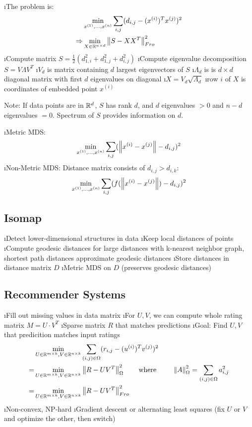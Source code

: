 \be
\i The problem is: \begin{align*}
&\min_{x^{(1)}, \ldots, x^{(n)}} \displaystyle\sum_{i,j} (d_{i,j} - (x^{(i)})^Tx^{(j)})^2 \\
\Rightarrow & \min_{X \in \mathbb{R}^{n \times d}} \left\lVert S-XX^T\right\rVert^2_{Fro} 
\end{align*}
\i Compute matrix $S = \frac{1}{2} (d^2_{1,i} + d^2_{1,j} + d^2_{i,j})$
\i Compute eigenvalue decomposition $S = V \Lambda V^T$
\i $V_d$ is matrix containing $d$ largest eigenvectors of $S$
\i $\Lambda_d$ is is $d \times d$ diagonal matrix with first $d$ eigenvalues on diagonal
\i $X = V_d \sqrt{\Lambda_d}$
\i row $i$ of $X$ is coordinates of embedded point $x^{(i)}$
\ee

Note: If data points are in $\mathbb{R}^d$, $S$ has rank $d$, and $d$ eigenvalues $>0$ and $n-d$ eigenvalues $=0$. Spectrum of $S$ provides information on $d$.


\bi
\i Metric MDS: \[\min_{x^{(1)}, \ldots, x^{(n)}} \displaystyle\sum_{i,j} ( \left\lVert x^{(i)} - x^{(j)}\right\rVert - d_{i,j})^2 \]
\i Non-Metric MDS: Distance matrix consists of $d_{i,j} > d_{i,k}$: \[\min_{x^{(1)}, \ldots, x^{(n)}} \displaystyle\sum_{i,j} ( f(\left\lVert x^{(i)} - x^{(j)}\right\rVert) - d_{i,j})^2\]
\ei

\subsection{Isomap}

\bi
\i Detect lower-dimensional structures in data
\i Keep local distances of points
\i Compute geodesic distances for large distances with k-nearest neighbor graph, shortest path distances approximate geodesic distances
\i Store distances in distance matrix $D$
\i Metric MDS on $D$ (preserves geodesic distances)
\ei

\subsection{Recommender Systems}

\bi
\i Fill out missing values in data matrix
\i For $U,V$, we can compute whole rating matrix $M = U \cdot V^T$
\i Sparse matrix $R$ that matches predictions
\i Goal: Find $U, V$ that predicition matches input ratings \begin{align*}
& \min_{U \in \mathbb{R}^{m \times k}, V \in \mathbb{R}^{n \times k}} \displaystyle\sum_{(i,j) \in \Omega} (r_{i,j} - (u^{(i)})^T v^{(j)})^2 \\
= & \min_{U \in \mathbb{R}^{m \times k}, V \in \mathbb{R}^{n \times k}} \left\lVert R - UV^T\right\rVert^2_{\Omega} \qquad \text{where } \qquad \left\lVert A\right\rVert_\Omega^2 = \displaystyle\sum_{(i,j) \in \Omega} a_{i,j}^2\\
= & \min_{U \in \mathbb{R}^{m \times k}, V \in \mathbb{R}^{n \times k}} \left\lVert R - UV^T\right\rVert^2_{Fro}
\end{align*}
\i Non-convex, NP-hard
\i Gradient descent or alternating least squares (fix $U$ or $V$ and optimize the other, then switch)
\ei

